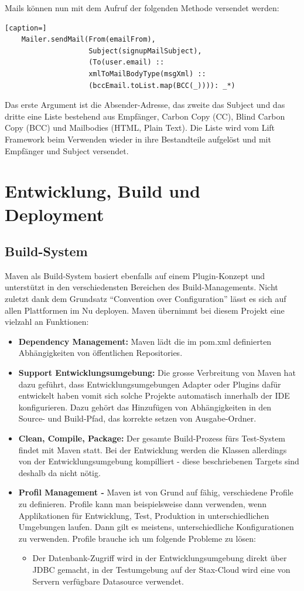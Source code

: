  Mails k\"onnen nun mit dem Aufruf der folgenden Methode versendet werden:
\begin{lstlisting}[caption=]
    Mailer.sendMail(From(emailFrom), 
                    Subject(signupMailSubject),
                    (To(user.email) :: 
                    xmlToMailBodyType(msgXml) ::
                    (bccEmail.toList.map(BCC(_)))): _*)
\end{lstlisting} 

Das erste Argument ist die Absender-Adresse, das zweite das Subject und das dritte eine Liste bestehend aus Empf\"anger, Carbon Copy (CC), Blind Carbon Copy (BCC) und Mailbodies (HTML, Plain Text). Die Liste wird vom Lift Framework beim Verwenden wieder in ihre Bestandteile aufgel\"ost und mit Empf\"anger und Subject versendet. 

\chapter{Entwicklung, Build und Deployment}

\section{Build-System}Maven als Build-System basiert ebenfalls auf einem Plugin-Konzept und unterst\"utzt in den verschiedensten Bereichen des Build-Managements. Nicht zuletzt dank dem Grundsatz ``Convention over Configuration'' l\"asst es sich auf allen Plattformen im Nu deployen. Maven \"ubernimmt bei diesem Projekt eine vielzahl an Funktionen:

\begin{itemize}
\item \textbf{Dependency Management: } Maven l\"adt die im pom.xml definierten Abh\"angigkeiten von \"offentlichen Repositories. 
\item \textbf{Support Entwicklungsumgebung:  } Die grosse Verbreitung von Maven hat dazu gef\"uhrt, dass Entwicklungsumgebungen Adapter oder Plugins daf\"ur entwickelt haben vomit sich solche Projekte automatisch innerhalb der IDE konfigurieren. Dazu geh\"ort das Hinzuf\"ugen von Abh\"angigkeiten in den Source- und Build-Pfad, das korrekte setzen von Ausgabe-Ordner. 
\item \textbf{Clean, Compile, Package: }Der gesamte Build-Prozess f\"urs Test-System findet mit Maven statt. Bei der Entwicklung werden die Klassen allerdings von der Entwicklungsumgebung kompilliert - diese beschriebenen Targets sind deshalb da nicht n\"otig. 
\item \textbf{Profil Management - } Maven ist von Grund auf f\"ahig, verschiedene Profile zu definieren. Profile kann man beispielsweise dann verwenden, wenn Applikationen f\"ur Entwicklung, Test, Produktion in unterschiedlichen Umgebungen laufen. Dann gilt es meistens, unterschiedliche Konfigurationen zu verwenden. Profile brauche ich um folgende Probleme zu l\"osen:\begin{itemize}
\item Der Datenbank-Zugriff wird in der Entwicklungsumgebung direkt \"uber JDBC gemacht, in der Testumgebung auf der Stax-Cloud wird eine von Servern verf\"ugbare Datasource verwendet.
\end{itemize}
\end{itemize}
